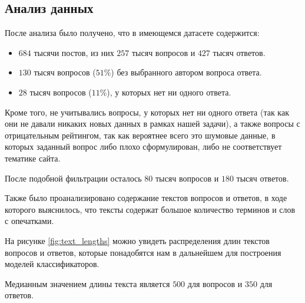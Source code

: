 \documentclass[../diploma.tex]{subfiles}
\begin{document}
	\subsection{Анализ данных}
	После анализа было получено, что в имеющемся датасете содержится: 

	\begin{itemize}

		\item
		$684$ тысячи постов, из них $257$ тысяч вопросов и $427$ тысяч ответов.

		\item
		$130$ тысяч вопросов ($51 \%$) без выбранного автором вопроса ответа.

		\item
		$28$ тысяч вопросов ($11 \%$), у которых нет ни одного ответа.
	\end{itemize}

	Кроме того, не учитывались вопросы, у которых нет ни одного ответа (так как они не давали никаких новых данных в рамках нашей задачи), 
	а также вопросы с отрицательным рейтингом, так как вероятнее всего это шумовые данные, 
	в которых заданный вопрос либо плохо сформулирован, либо не соответствует тематике сайта.

	После подобной фильтрации осталось $80$ тысяч вопросов и $180$ тысяч ответов.

	Также было проанализировано содержание текстов вопросов и ответов, в ходе которого выяснилось, 
	что тексты содержат большое количество терминов и слов с опечатками.

	На рисунке \ref{fig:text_lengths} можно увидеть распределения длин текстов вопросов и ответов, 
	которые понадобятся нам в дальнейшем для построения моделей классификаторов.

	Медианным значением длины текста является $500$ для вопросов и $350$ для ответов.
\end{document}
